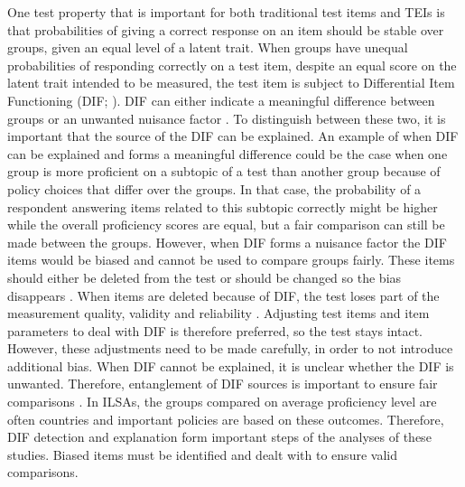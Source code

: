 \documentclass{interact}
\begin{document}
One test property that is important for both traditional test items and TEIs is that probabilities of giving a correct response on an item should be stable over groups, given an equal level of a latent trait. When groups have unequal probabilities of responding correctly on a test item, despite an equal score on the latent trait intended to be measured, the test item is subject to Differential Item Functioning (DIF; \cite{hambleton1989detecting}). DIF can either indicate a meaningful difference between groups or an unwanted nuisance factor \parencite{ercikan2002disentangling, kalayciouglu2011differential}. To distinguish between these two, it is important that the source of the DIF can be explained. An example of when DIF can be explained and forms a meaningful difference could be the case when one group is more proficient on a subtopic of a test than another group because of policy choices that differ over the groups. In that case, the probability of a respondent answering items related to this subtopic correctly might be higher while the overall proficiency scores are equal, but a fair comparison can still be made between the groups. However, when DIF forms a nuisance factor the DIF items would be biased and cannot be used to compare groups fairly. These items should either be deleted from the test or should be changed so the bias disappears \parencite{hagquist2019explaining}. When items are deleted because of DIF, the test loses part of the measurement quality, validity and reliability \parencite{hambleton2006good}. Adjusting test items and item parameters to deal with DIF is therefore preferred, so the test stays intact. However, these adjustments need to be made carefully, in order to not introduce additional bias. When DIF cannot be explained, it is unclear whether the DIF is unwanted. Therefore, entanglement of DIF sources is important to ensure fair comparisons \parencite{sireci2013decisions}. In ILSAs, the groups compared on average proficiency level are often countries and important policies are based on these outcomes. Therefore, DIF detection and explanation form important steps of the analyses of these studies. Biased items must be identified and dealt with to ensure valid comparisons.
\end{document}
